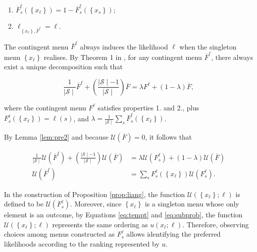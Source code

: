 \begin{enumerate}
	\item \( \overline{F}^{\ell}_s \left( \left\{ x_{\ell} \right\} \right) = 1 - \overline{F}^{\ell}_s \left( \left\{ x_s \right\} \right) \);
	\item \( \ell_{\left\{ x_{\ell} \right\}, \overline{F}^{\ell}} = \ell \).
\end{enumerate}

The contingent menu \( \overline{F}^{\ell} \) always induces the likelihood \( \ell \) when the singleton menu \( \left\{ x_{\ell} \right\} \) realises. By Theorem 1 in \cite{liangInformationdependentExpectedUtility2017}, for any contingent menu \( \overline{F}^{\ell} \), there always exist a unique decomposition such that

\[ \frac{1}{ \mid \mathcal{S} \mid } \overline{F}^{\ell} + \left( \frac{\mid \mathcal{S} \mid - 1}{\mid \mathcal{S} \mid} \right) \overline{F} = \lambda F^{\ell} + \left( 1 - \lambda \right) \overline{F} ,
\]

where the contingent menu \( F^{\ell} \) satisfies properties 1. and 2., plus \( F_s^{\ell} \left( \left\{ x_{\ell} \right\} \right) = \ell \left( s \right) \), and \( \lambda = \frac{1}{\mid \mathcal{S} \mid} \sum_{s} \overline{F}_s^{\ell} \left( \left\{ x_{\ell} \right\} \right) \).

By Lemma \ref{lem:pre2} and because \( \mathscr{U} \left( \overline{F} \right) = 0 \), it follows that

\begin{align*}
	\frac{1}{\mid \mathcal{S} \mid} \mathscr{U} \left( \overline{F}^{\ell} \right) + \left( \frac{\mid \mathcal{S} \mid - 1}{\mid \mathcal{S} \mid} \right) \mathscr{U} \left( \overline{F} \right) & = \lambda \mathscr{U} \left( F_s^{\ell} \right) + \left( 1 - \lambda \right) \mathscr{U} \left( \overline{F} \right) \\
	\mathscr{U} \left(  \overline{F}^{\ell} \right)                                                                                                                                                 & = \sum_{s} F_s^{\ell} \left( \left\{ x_{\ell} \right\} \right) \mathscr{U} \left(F_s^{\ell} \right) .
\end{align*}

In the construction of Proposition \ref{prop:liang}, the function \( \mathcal{U} \left( \left\{ x_{\ell} \right\}; \ell \right) \) is defined to be \( \mathscr{U} \left( F_s^{\ell} \right) \). Moreover, since \( \left\{ x_{\ell} \right\} \) is a singleton menu whose only element is an outcome, by Equations \eqref{eq:tempt} and \eqref{eq:subprob}, the function \( \mathcal{U} \left( \left\{ x_{\ell} \right\}; \ell \right) \) represents the same ordering as \( u \left( x_{\ell} ; \ell \right) \). Therefore, observing choices among menus constructed as \( F_s^{\ell} \) allows identifying the preferred likelihoods according to the ranking represented by \( u \).

